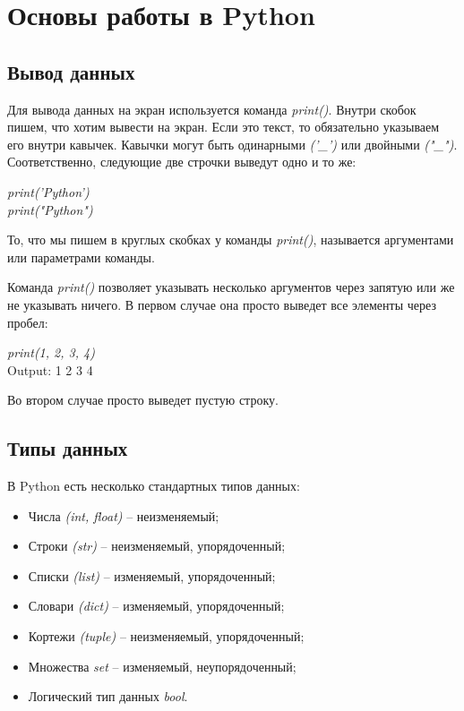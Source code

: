 \section{Основы работы в Python}

\subsection{Вывод данных}

Для вывода данных на экран используется команда \colorbox[rgb]{0.95, 0.95, 0.95}{\textit{print()}}. Внутри скобок пишем, что хотим вывести на экран. Если это текст, то обязательно указываем его внутри кавычек. Кавычки могут быть одинарными \textit{('\_')} или двойными \textit{("\_")}. Соответственно, следующие две строчки выведут одно и то же:

\begin{flushleft}
	\colorbox[rgb]{0.95, 0.95, 0.95}{\textit{print('Python')}} \\
	\colorbox[rgb]{0.95, 0.95, 0.95}{\textit{print("Python")}}
\end{flushleft}

То, что мы пишем в круглых скобках у команды \colorbox[rgb]{0.95, 0.95, 0.95}{\textit{print()}}, называется аргументами или параметрами команды.

Команда \colorbox[rgb]{0.95, 0.95, 0.95}{\textit{print()}} позволяет указывать несколько аргументов через запятую или же не указывать ничего. В первом случае она просто выведет все элементы через пробел:

\begin{flushleft}
	\colorbox[rgb]{0.95, 0.95, 0.95}{\textit{print(1, 2, 3, 4)}} \\
	\colorbox[rgb]{0.95, 0.95, 0.95}{Output: 1 2 3 4}
\end{flushleft}

Во втором случае просто выведет пустую строку.

\subsection{Типы данных}

В Python есть несколько стандартных типов данных:

\begin{itemize}
	\setlength\itemsep{0.01cm}
	\item Числа \textit{(int, float)} -- неизменяемый;
	\item Строки \textit{(str)} -- неизменяемый, упорядоченный;
	\item Списки \textit{(list)} -- изменяемый, упорядоченный;
	\item Словари \textit{(dict)} -- изменяемый, упорядоченный;
	\item Кортежи \textit{(tuple)} -- неизменяемый, упорядоченный;
	\item Множества \textit{set} -- изменяемый, неупорядоченный;
	\item Логический тип данных \textit{bool}.
\end{itemize}

